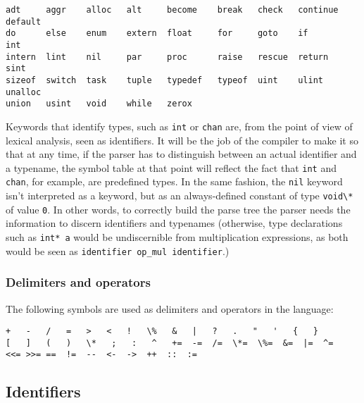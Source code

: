 \begin{lstlisting}
adt     aggr    alloc   alt     become    break   check   continue  default
do      else    enum    extern  float     for     goto    if        int
intern  lint    nil     par     proc      raise   rescue  return    sint
sizeof  switch  task    tuple   typedef   typeof  uint    ulint     unalloc
union   usint   void    while   zerox
\end{lstlisting}

Keywords that identify types, such as \passthrough{\lstinline!int!} or
\passthrough{\lstinline!chan!} are, from the point of view of lexical
analysis, seen as identifiers. It will be the job of the compiler to
make it so that at any time, if the parser has to distinguish between an actual
identifier and a typename, the symbol table at that point will
reflect the fact that \passthrough{\lstinline!int!} and
\passthrough{\lstinline!chan!}, for example, are predefined types. In the same
fashion, the \passthrough{\lstinline!nil!} keyword isn't interpreted as
a keyword, but as an always-defined constant of type
\passthrough{\lstinline!void\\*!} of value
\passthrough{\lstinline!0!}. In other words, to correctly build the parse tree
the parser needs the information to discern identifiers and typenames (otherwise, 
type declarations such as \passthrough{\lstinline!int* a!} would be undiscernible 
from multiplication expressions, as both would be seen as 
\passthrough{\lstinline!identifier op_mul identifier!}.)

\hypertarget{delimiters-and-operators}{%
\subsubsection{Delimiters and operators}\label{delimiters-and-operators}}

The following symbols are used as delimiters and operators in the
language:

\begin{lstlisting}
+   -   /   =   >   <   !   \%   &   |   ?   .   "   '   {   } 
[   ]   (   )   \*   ;   :   ^   +=  -=  /=  \*=  \%=  &=  |=  ^=
<<= >>= ==  !=  --  <-  ->  ++  ::  :=
\end{lstlisting}

\hypertarget{identifiers}{%
\subsection{Identifiers}\label{identifiers}}

